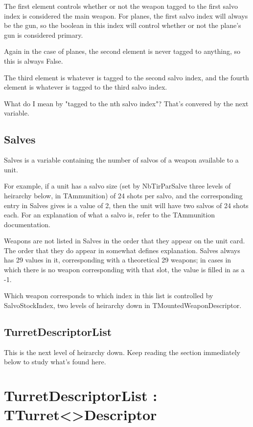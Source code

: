 \documentclass{article}
\begin{document}
The first element controls whether or not the weapon tagged to the first salvo index is considered the main weapon. For planes, the first salvo index will always be the gun, so the boolean in this index will control whether or not the plane's gun is considered primary.

Again in the case of planes, the second element is never tagged to anything, so this is always False.

The third element is whatever is tagged to the second salvo index, and the fourth element is whatever is tagged to the third salvo index.

What do I mean by "tagged to the nth salvo index"? That's convered by the next variable.

\subsection{Salves}

Salves is a variable containing the number of salvos of a weapon available to a unit.

For example, if a unit has a salvo size (set by NbTirParSalve three levels of heirarchy below, in TAmmunition) of 24 shots per salvo, and the corresponding entry in Salves gives is a value of 2, then the unit will have two salvos of 24 shots each. For an explanation of what a salvo is, refer to the TAmmunition documentation.

Weapons are not listed in Salves in the order that they appear on the unit card. The order that they do appear in somewhat defines explanation. Salves always has 29 values in it, corresponding with a theoretical 29 weapons; in cases in which there is no weapon corresponding with that slot, the value is filled in as a -1.

Which weapon corresponds to which index in this list is controlled by SalvoStockIndex, two levels of heirarchy down in TMountedWeaponDescriptor.

\subsection{TurretDescriptorList}

This is the next level of heirarchy down. Keep reading the section immediately below to study what's found here.

\section{TurretDescriptorList : TTurret\textless *\textgreater Descriptor}
\end{document}
